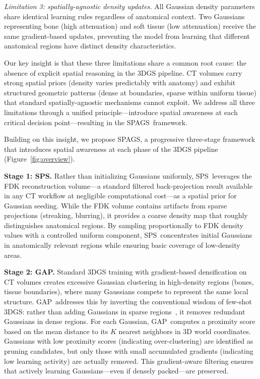 \documentclass{egPublStyle}
\newcommand{\spags}{SPAGS}
\newcommand{\sps}{SPS}
\newcommand{\gap}{GAP}
\begin{document}
\textit{Limitation 3: spatially-agnostic density updates.} All Gaussian density parameters share identical learning rules regardless of anatomical context. Two Gaussians representing bone (high attenuation) and soft tissue (low attenuation) receive the same gradient-based updates, preventing the model from learning that different anatomical regions have distinct density characteristics.

Our key insight is that these three limitations share a common root cause: the absence of explicit spatial reasoning in the 3DGS pipeline. CT volumes carry strong spatial priors (density varies predictably with anatomy) and exhibit structured geometric patterns (dense at boundaries, sparse within uniform tissue) that standard spatially-agnostic mechanisms cannot exploit. We address all three limitations through a unified principle---introduce spatial awareness at each critical decision point---resulting in the \spags\ framework.

Building on this insight, we propose \spags, a progressive three-stage framework that introduces spatial awareness at each phase of the 3DGS pipeline (Figure~\ref{fig:overview}).

\textbf{Stage 1: \sps.} Rather than initializing Gaussians uniformly, \sps\ leverages the FDK reconstruction volume---a standard filtered back-projection result available in any CT workflow at negligible computational cost---as a spatial prior for Gaussian seeding. While the FDK volume contains artifacts from sparse projections (streaking, blurring), it provides a coarse density map that roughly distinguishes anatomical regions. By sampling proportionally to FDK density values with a controlled uniform component, \sps\ concentrates initial Gaussians in anatomically relevant regions while ensuring basic coverage of low-density areas.

\textbf{Stage 2: \gap.} Standard 3DGS training with gradient-based densification on CT volumes creates excessive Gaussian clustering in high-density regions (bones, tissue boundaries), where many Gaussians compete to represent the same local structure. \gap\ addresses this by inverting the conventional wisdom of few-shot 3DGS: rather than adding Gaussians in sparse regions~\cite{zhu2024fsgs}, it removes redundant Gaussians in dense regions. For each Gaussian, \gap\ computes a proximity score based on the mean distance to its $K$ nearest neighbors in 3D world coordinates. Gaussians with low proximity scores (indicating over-clustering) are identified as pruning candidates, but only those with small accumulated gradients (indicating low learning activity) are actually removed. This gradient-aware filtering ensures that actively learning Gaussians---even if densely packed---are preserved.
\end{document}
